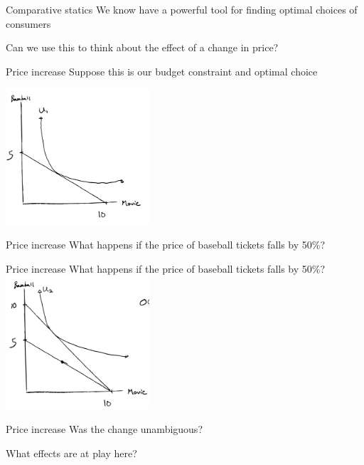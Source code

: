 \documentclass[aspectratio=169]{beamer}
\begin{document}
\begin{frame}{Comparative statics}
    We know have a powerful tool for finding optimal choices of consumers

    \vspace{2mm}

    Can we use this to think about the effect of a change in price?
\end{frame}

\begin{frame}{Price increase}
    Suppose this is our budget constraint and optimal choice

    \centering
        \includegraphics[width = 0.4\textwidth,keepaspectratio]{../figs/OC1.png}

\end{frame}

\begin{frame}{Price increase}
    What happens if the price of baseball tickets falls by 50\%?

\end{frame}

\begin{frame}{Price increase}
    What happens if the price of baseball tickets falls by 50\%?
    \centering
        \includegraphics[width = 0.4\textwidth,keepaspectratio]{../figs/OC2.png}
\end{frame}

\begin{frame}{Price increase}
    Was the change unambiguous?

    \vspace{2mm}

    What effects are at play here?
\end{frame}
\end{document}
